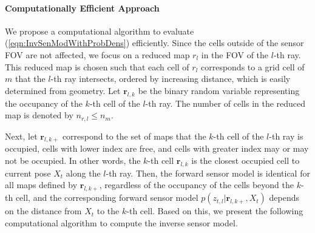\documentclass[letterpaper, 10pt, conference]{ieeeconf}
\newcommand{\refeqn}[1]{(\ref{eqn:#1})}
\begin{document}
	
\paragraph{Computationally Efficient Approach}

We propose a computational algorithm to evaluate \refeqn{InvSenModWithProbDens} efficiently. 
Since the cells outside of the sensor FOV are not affected, we focus on a reduced map $r_l$ in the FOV of the $l$-th ray. This reduced map is chosen such that each cell of $r_l$ corresponds to a grid cell of $m$ that the $l$-th ray intersects, ordered by increasing distance, which is easily determined from geometry. Let $\mathbf{r}_{l,k}$ be the binary random variable representing the occupancy of the $k$-th cell of the $l$-th ray. The number of cells in the reduced map is denoted by $n_{r,l}\leq n_m$.

Next, let $\mathbf{r}_{l,k+}$ correspond to the set of maps that the $k$-th cell of the $l$-th ray is occupied, cells with lower index are free, and cells with greater index may or may not be occupied. In other words, the $k$-th cell $\mathbf{r}_{l,k}$ is the closest occupied cell to current pose $X_t$ along the $l$-th ray. Then, the forward sensor model is identical for all maps defined by $\mathbf{r}_{l,k+}$, regardless of the occupancy of the cells beyond the $k$-th cell, and the corresponding forward sensor model $p(z_{t,l}|\mathbf{r}_{l,k+},X_{t})$ depends on the distance from $X_t$ to the $k$-th cell. Based on this, we present the following computational algorithm to compute the inverse sensor model.
\end{document}
